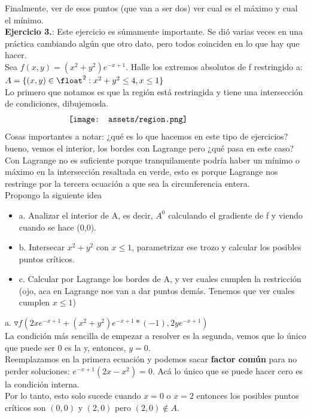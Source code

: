 \documentclass[10pt,a4paper]{article}
\begin{document}
Finalmente, ver de esos puntos (que van a ser dos) ver cual es el máximo y cual el mínimo. \\
\textbf{Ejercicio 3.}: Este ejercicio es súmamente importante. Se dió varias veces en una práctica cambiando algún que otro dato, pero todos coinciden en lo que hay que hacer. \\
Sea $f(x,y) = (x^{2} + y^{2}) e^{-x+1}$. Halle los extremos absolutos de f restringido a: $A = \{(x,y) \in \float^{2}: x^{2} + y^{2} \le 4, x \le 1\}$ \\
Lo primero que notamos es que la región está restringida y tiene una intersección de condiciones, dibujemosla. 
\[\begin{minipage}[b]{0.6\textwidth}
    \texttt{[image: assets/region.png]}
\end{minipage}\]
Cosas importantes a notar: ¿qué es lo que hacemos en este tipo de ejercicios? bueno, vemos el interior, los bordes con Lagrange pero ¿qué pasa en este caso? Con Lagrange no es suficiente porque tranquilamente podría haber un mínimo o máximo en la intersección resaltada en verde, esto es porque Lagrange nos restringe por la tercera ecuación a que sea la circunferencia entera. \\
Propongo la siguiente idea 
\begin{itemize}
    \item a. Analizar el interior de A, es decir, $A^{0}$ calculando el gradiente de f y viendo cuando se hace (0,0).
    \item b. Intersecar $x^{2} + y^{2}$ con $x \le 1$, parametrizar ese trozo y calcular los posibles puntos críticos. 
    \item c. Calcular por Lagrange los bordes de A, y ver cuales cumplen la restricción (ojo, aca en Lagrange nos van a dar puntos demás. Tenemos que ver cuales cumplen $x \le 1 $)
\end{itemize}
a. $\triangledown f (2xe^{-x+1}+(x^{2} + y^{2})e^{-x+1}*(-1), 2ye^{-x+1})$ \\
La condición más sencilla de empezar a resolver es la segunda, vemos que lo único que puede ser 0 es la y, entonces, $y = 0$. \\
Reemplazamos en la primera ecuación y podemos sacar \textbf{factor común} para no perder soluciones: $e^{-x+1}(2x-x^{2}) = 0$. Acá lo único que se puede hacer cero es la condición interna. \\
Por lo tanto, esto solo sucede cuando $x=0$ o $x=2$ entonces los posibles puntos críticos son $(0,0)$ y $(2,0)$ pero $(2,0) \notin A$. \\
\end{document}
